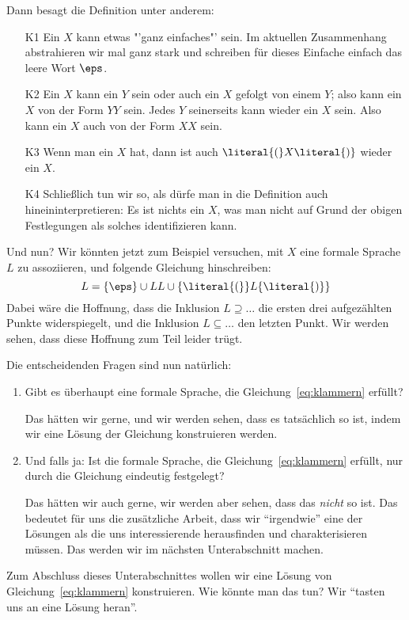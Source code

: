 Dann besagt die Definition unter anderem:
%
\begin{itemize}
\item[K1]\label{K1} Ein $X$ kann etwas "'ganz einfaches"' sein. Im
  aktuellen Zusammenhang abstrahieren wir mal ganz stark und schreiben
  für dieses Einfache einfach das leere Wort $\eps$.
\item[K2]\label{K2} Ein $X$ kann ein $Y$ sein oder auch ein $X$
  gefolgt von einem $Y$; also kann ein $X$ von der Form $YY$ sein.
  Jedes $Y$ seinerseits kann wieder ein $X$ sein. Also kann ein $X$
  auch von der Form $XX$ sein.
\item[K3]\label{K3} Wenn man ein $X$ hat, dann ist auch
  $\literal{(}X\literal{)}$ wieder ein $X$.
\item[K4]\label{K4} Schließlich tun wir so, als dürfe man in die
  Definition auch hineininterpretieren: Es ist nichts ein $X$, was man
  nicht auf Grund der obigen Festlegungen als solches identifizieren
  kann.
\end{itemize}
%
Und nun? Wir könnten jetzt zum Beispiel versuchen, mit $X$ eine
formale Sprache $L$ zu assoziieren, und folgende Gleichung
hinschreiben:
\begin{equation}
L = \{ \eps \} \cup LL \cup \{\literal{(}\} L \{\literal{)}\}
\label{eq:klammern}
\end{equation}
Dabei wäre die Hoffnung, dass die Inklusion $L\supseteq \dots$ die
ersten drei aufgezählten Punkte widerspiegelt, und die Inklusion
$L\subseteq \dots$ den letzten Punkt. Wir werden sehen, dass diese
Hoffnung zum Teil leider trügt.

Die entscheidenden Fragen sind nun natürlich:
%
\begin{enumerate}
\item Gibt es überhaupt eine formale Sprache, die
  Gleichung~\ref{eq:klammern} erfüllt? 

  Das hätten wir gerne, und wir werden sehen, dass es tatsächlich so
  ist, indem wir eine Lösung der Gleichung konstruieren werden.
\item Und falls ja: Ist die formale Sprache, die
  Gleichung~\ref{eq:klammern} erfüllt, nur durch die Gleichung
  eindeutig festgelegt? 

  Das hätten wir auch gerne, wir werden aber sehen, dass das
  \emph{nicht} so ist.  Das bedeutet für uns die zusätzliche Arbeit,
  dass wir "`irgendwie"' eine der Lösungen als die uns interessierende
  herausfinden und charakterisieren müssen. Das werden wir im nächsten
  Unterabschnitt machen.
\end{enumerate}
% 
Zum Abschluss dieses Unterabschnittes wollen wir eine Lösung von
Gleichung~\ref{eq:klammern} konstruieren.  Wie könnte man das tun?
Wir "`tasten uns an eine Lösung heran"'.

